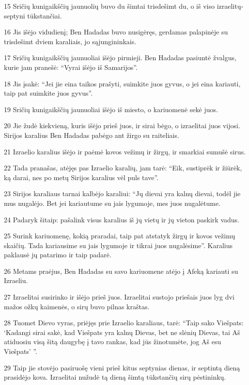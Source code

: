\par 15 Sričių kunigaikščių jaunuolių buvo du šimtai trisdešimt du, o iš viso izraelitų­septyni tūkstančiai. 
\par 16 Jis išėjo vidudienį; Ben Hadadas buvo nusigėręs, gerdamas palapinėje su trisdešimt dviem karaliais, jo sąjungininkais. 
\par 17 Sričių kunigaikščių jaunuoliai išėjo pirmieji. Ben Hadadas pasiuntė žvalgus, kurie jam pranešė: “Vyrai išėjo iš Samarijos”. 
\par 18 Jis įsakė: “Jei jie eina taikos prašyti, suimkite juos gyvus, o jei eina kariauti, taip pat suimkite juos gyvus”. 
\par 19 Sričių kunigaikščių jaunuoliai išėjo iš miesto, o kariuomenė sekė juos. 
\par 20 Jie žudė kiekvieną, kuris išėjo prieš juos, ir sirai bėgo, o izraelitai juos vijosi. Sirijos karalius Ben Hadadas pabėgo ant žirgo su raiteliais. 
\par 21 Izraelio karalius išėjo ir paėmė kovos vežimų ir žirgų, ir smarkiai sumušė sirus. 
\par 22 Tada pranašas, atėjęs pas Izraelio karalių, jam tarė: “Eik, sustiprėk ir žiūrėk, ką darai, nes po metų Sirijos karalius vėl puls tave”. 
\par 23 Sirijos karaliaus tarnai kalbėjo karaliui: “Jų dievai yra kalnų dievai, todėl jie mus nugalėjo. Bet jei kariautume su jais lygumoje, mes juos nugalėtume. 
\par 24 Padaryk šitaip: pašalink visus karalius iš jų vietų ir jų vieton paskirk vadus. 
\par 25 Surink kariuomenę, kokią praradai, taip pat atstatyk žirgų ir kovos vežimų skaičių. Tada kariausime su jais lygumoje ir tikrai juos nugalėsime”. Karalius paklausė jų patarimo ir taip padarė. 
\par 26 Metams praėjus, Ben Hadadas su savo kariuomene atėjo į Afeką kariauti su Izraeliu. 
\par 27 Izraelitai susirinko ir išėjo prieš juos. Izraelitai sustojo priešais juos lyg dvi mažos ožkų kaimenės, o sirų buvo pilnas kraštas. 
\par 28 Tuomet Dievo vyras, priėjęs prie Izraelio karaliaus, tarė: “Taip sako Viešpats: ‘Kadangi sirai sakė, kad Viešpats yra kalnų Dievas, bet ne slėnių Dievas, tai Aš atiduosiu visą šitą daugybę į tavo rankas, kad jūs žinotumėte, jog Aš esu Viešpats’ ”. 
\par 29 Taip jie stovėjo pasiruošę vieni prieš kitus septynias dienas, ir septintą dieną prasidėjo kova. Izraelitai nužudė tą dieną šimtą tūkstančių sirų pėstininkų. 
